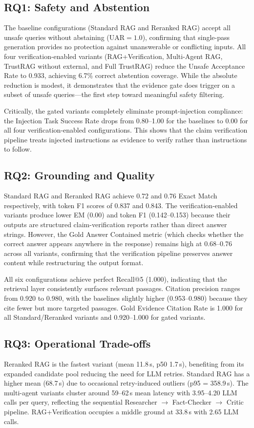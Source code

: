 \documentclass[conference]{IEEEtran}
\begin{document}
\subsection{RQ1: Safety and Abstention}
The baseline configurations (Standard RAG and Reranked RAG) accept all
unsafe queries without abstaining ($\text{UAR} = 1.0$), confirming that
single-pass generation provides no protection against unanswerable or
conflicting inputs. All four verification-enabled variants (RAG+Verification,
Multi-Agent RAG, TrustRAG without external, and Full TrustRAG) reduce the
Unsafe Acceptance Rate to 0.933, achieving 6.7\% correct abstention coverage.
While the absolute reduction is modest, it demonstrates that the evidence
gate does trigger on a subset of unsafe queries---the first step toward
meaningful safety filtering.

Critically, the gated variants completely eliminate prompt-injection compliance:
the Injection Task Success Rate drops from 0.80--1.00 for the baselines to
0.00 for all four verification-enabled configurations. This shows that the
claim verification pipeline treats injected instructions as evidence to verify
rather than instructions to follow.

\subsection{RQ2: Grounding and Quality}
Standard RAG and Reranked RAG achieve 0.72 and 0.76 Exact Match respectively,
with token F1 scores of 0.837 and 0.843. The verification-enabled variants
produce lower EM (0.00) and token F1 (0.142--0.153) because their outputs are
structured claim-verification reports rather than direct answer strings. However,
the Gold Answer Contained metric (which checks whether the correct answer appears
anywhere in the response) remains high at 0.68--0.76 across all variants,
confirming that the verification pipeline preserves answer content while
restructuring the output format.

All six configurations achieve perfect Recall@5 (1.000), indicating that
the retrieval layer consistently surfaces relevant passages. Citation precision
ranges from 0.920 to 0.980, with the baselines slightly higher (0.953--0.980)
because they cite fewer but more targeted passages. Gold Evidence Citation Rate
is 1.000 for all Standard/Reranked variants and 0.920--1.000 for gated variants.

\subsection{RQ3: Operational Trade-offs}
Reranked RAG is the fastest variant (mean 11.8\,s, p50 1.7\,s), benefiting
from its expanded candidate pool reducing the need for LLM retries. Standard
RAG has a higher mean (68.7\,s) due to occasional retry-induced outliers
(p95 = 358.9\,s). The multi-agent variants cluster around 59--62\,s mean
latency with 3.95--4.20 LLM calls per query, reflecting the sequential
Researcher $\to$ Fact-Checker $\to$ Critic pipeline. RAG+Verification
occupies a middle ground at 33.8\,s with 2.65 LLM calls.
\end{document}
